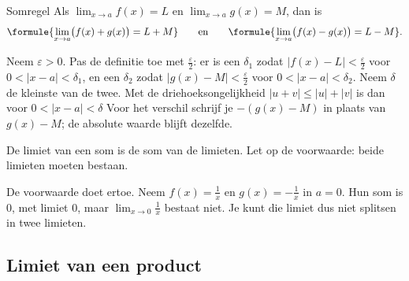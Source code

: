 \begin{theorie}
\begin{stelling}{Somregel}
Als $\lim_{x \to a} f(x) = L$ en $\lim_{x \to a} g(x) = M$, dan is
\[\formule{\lim_{x \to a} \bigl(f(x) + g(x)\bigr) = L + M} \qquad\text{en}\qquad \formule{\lim_{x \to a} \bigl(f(x) - g(x)\bigr) = L - M}.\]
\end{stelling}
\begin{bewijs}
Neem $\varepsilon > 0$. Pas de definitie toe met $\frac{\varepsilon}{2}$: er is een $\delta_1$ zodat $|f(x) - L| < \frac{\varepsilon}{2}$ voor $0 < |x - a| < \delta_1$, en een $\delta_2$ zodat $|g(x) - M| < \frac{\varepsilon}{2}$ voor $0 < |x - a| < \delta_2$. Neem $\delta$ de kleinste van de twee. Met de driehoeksongelijkheid $|u + v| \leqslant |u| + |v|$ is dan voor $0 < |x - a| < \delta$
Voor het verschil schrijf je $-(g(x) - M)$ in plaats van $g(x) - M$; de absolute waarde blijft dezelfde.
\end{bewijs}
\end{theorie}

De limiet van een som is de som van de limieten. Let op de voorwaarde: beide limieten moeten bestaan.


De voorwaarde doet ertoe. Neem $f(x) = \frac1x$ en $g(x) = -\frac1x$ in $a = 0$. Hun som is $0$, met limiet $0$, maar $\lim_{x \to 0} \frac1x$ bestaat niet. Je kunt die limiet dus niet splitsen in twee limieten.

\begin{oefeningen}
\end{oefeningen}

\subsection{Limiet van een product}

